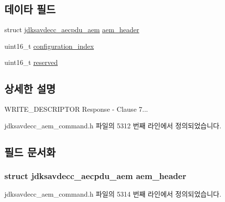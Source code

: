 \subsection*{데이타 필드}
\begin{DoxyCompactItemize}
\item 
struct \hyperlink{structjdksavdecc__aecpdu__aem}{jdksavdecc\+\_\+aecpdu\+\_\+aem} \hyperlink{structjdksavdecc__aem__command__write__descriptor__response_ae1e77ccb75ff5021ad923221eab38294}{aem\+\_\+header}
\item 
uint16\+\_\+t \hyperlink{structjdksavdecc__aem__command__write__descriptor__response_afaad1bd7c66f9611e134d8c5ce98f444}{configuration\+\_\+index}
\item 
uint16\+\_\+t \hyperlink{structjdksavdecc__aem__command__write__descriptor__response_a5a6ed8c04a3db86066924b1a1bf4dad3}{reserved}
\end{DoxyCompactItemize}


\subsection{상세한 설명}
W\+R\+I\+T\+E\+\_\+\+D\+E\+S\+C\+R\+I\+P\+T\+OR Response -\/ Clause 7... 

jdksavdecc\+\_\+aem\+\_\+command.\+h 파일의 5312 번째 라인에서 정의되었습니다.



\subsection{필드 문서화}
\subsubsection[{\texorpdfstring{aem\+\_\+header}{aem_header}}]{\setlength{\rightskip}{0pt plus 5cm}struct {\bf jdksavdecc\+\_\+aecpdu\+\_\+aem} aem\+\_\+header}\hypertarget{structjdksavdecc__aem__command__write__descriptor__response_ae1e77ccb75ff5021ad923221eab38294}{}\label{structjdksavdecc__aem__command__write__descriptor__response_ae1e77ccb75ff5021ad923221eab38294}


jdksavdecc\+\_\+aem\+\_\+command.\+h 파일의 5314 번째 라인에서 정의되었습니다.

